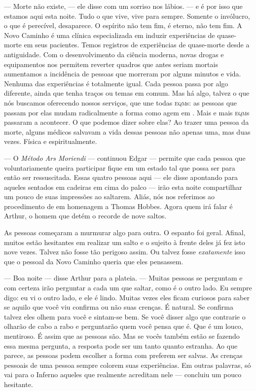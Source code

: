 --- Morte não existe, --- ele disse com um sorriso nos lábios. --- e é por isso que estamos aqui esta noite. Tudo o que vive, vive para sempre. Somente o invólucro, o que é perecível, desaparece. O espírito não tem fim, é eterno, não tem fim. A Novo Caminho é uma clínica especializada em induzir experiências de quase-morte em seus pacientes. Temos registros de experiências de quase-morte desde a antiguidade. Com o desenvolvimento da ciência moderna, novas drogas e equipamentos nos permitem reverter quadros que antes seriam mortais aumentamos a incidência de pessoas que morreram por alguns minutos e  vida. Nenhuma das experiências é totalmente igual. Cada pessoa passa por algo diferente, ainda que tenha traços ou temas em comum. Mas há algo, talvez o que nós buscamos oferecendo nossos serviços, que une todas \textsc{eqm}s: as pessoas que passam por elas mudam radicalmente a forma como agem em . Mais e mais \textsc{eqm}s passaram a acontecer. O que podemos dizer sobre elas? Ao trazer uma pessoa da morte, alguns médicos salvavam a vida dessas pessoas não apenas uma, mas duas vezes. Física e espiritualmente.

--- O \emph{Método Ars Moriendi} --- continuou Edgar --- permite que cada pessoa que voluntariamente queira participar fique em um estado tal que possa ser  para então ser ressuscitada. Essas quatro pessoas aqui --- ele disse apontando para aqueles sentados em cadeiras em cima do palco --- irão esta noite compartilhar um pouco de suas impressões ao saltarem. Aliás, nós nos referimos ao procedimento de  em homenagem a Thomas Hobbes. Agora quem irá falar é Arthur, o homem que detém o recorde de nove saltos.

As pessoas começaram a murmurar algo para outra. O espanto foi geral. Afinal, muitos estão hesitantes em realizar um salto e o sujeito à frente deles já fez isto nove vezes. Talvez não fosse tão perigoso assim. Ou talvez fosse \emph{exatamente} isso que o pessoal da Novo Caminho queria que eles pensassem.

--- Boa noite --- disse Arthur para a plateia. --- Muitas pessoas se perguntam e com certeza irão perguntar\mudanca{,} a cada um que saltar, como é o outro lado. Eu sempre digo: eu vi o outro lado, e ele é lindo. Muitas vezes\mudanca{,} eles ficam curiosos para saber se aquilo que você viu confirma ou não suas crenças. É natural. Se confirma\mudanca{,} talvez eles olhem para você e sintam-se bem. Se você disser algo que contrarie\mudanca{,} o olharão de cabo a rabo e perguntarão quem você pensa que é. Que é um louco, mentiroso. É assim que as pessoas são. Mas\mudanca{,} se vocês também estão se fazendo essa mesma pergunta, a resposta pode ser um tanto quanto estranha. Ao que parece, as pessoas podem escolher a forma com preferem ser salvas. As crenças pessoais de uma pessoa sempre colorem suas experiências. Em outras palavras, só vai para o Inferno aqueles que realmente acreditam nele --- concluiu\mudanca{,} um pouco hesitante.


